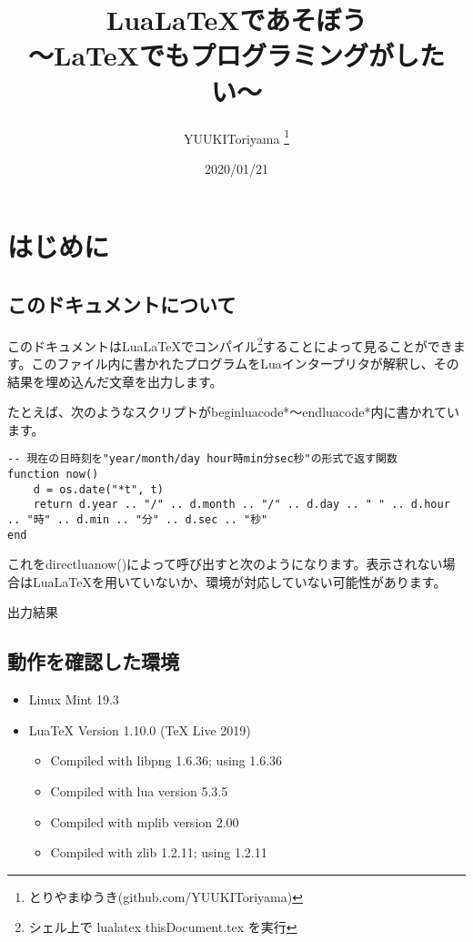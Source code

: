 \documentclass[a4paper]{article}
\begin{document}
\title{Lua\LaTeX であそぼう \\ {\normalsize〜\LaTeX でもプログラミングがしたい〜}}
\author{YUUKIToriyama \thanks{とりやまゆうき(github.com/YUUKIToriyama)}}
\date{2020/01/21}

\maketitle
\setcounter{tocdepth}{2}	
\tableofcontents

	\section{はじめに}
	
	\subsection{このドキュメントについて}
	このドキュメントはLua\LaTeX でコンパイル\footnote{シェル上で lualatex thisDocument.tex を実行}することによって見ることができます。このファイル内に書かれたプログラムをLuaインタープリタが解釈し、その結果を埋め込んだ文章を出力します。

	たとえば、次のようなスクリプトがbeginluacode*〜endluacode*内に書かれています。

	\begin{lstlisting}
-- 現在の日時刻を"year/month/day hour時min分sec秒"の形式で返す関数
function now()
	d = os.date("*t", t)
	return d.year .. "/" .. d.month .. "/" .. d.day .. " " .. d.hour .. "時" .. d.min .. "分" .. d.sec .. "秒"
end
	\end{lstlisting}

	これをdirectluanow()によって呼び出すと次のようになります。表示されない場合はLua\LaTeX を用いていないか、環境が対応していない可能性があります。
	
	\begin{itembox}[l]{出力結果}
	\end{itembox}

	\subsection{動作を確認した環境}
	\begin{itemize}
		\item Linux Mint 19.3
		\item LuaTeX Version 1.10.0 (TeX Live 2019)
			\begin{itemize}
				\item Compiled with libpng 1.6.36; using 1.6.36
				\item Compiled with lua version 5.3.5
				\item Compiled with mplib version 2.00
				\item Compiled with zlib 1.2.11; using 1.2.11
			\end{itemize}
	\end{itemize}
\end{document}
